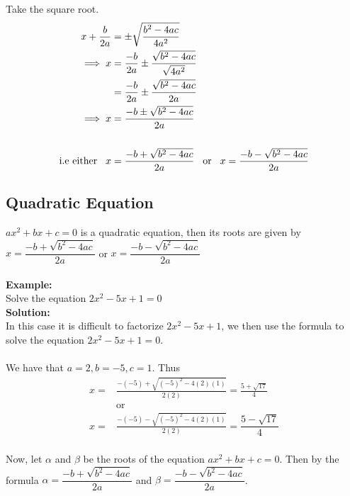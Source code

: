 \documentclass[11pt,a4paper]{article}
\begin{document}
Take the square root.
\begin{align*}
x+\frac{b}{2a} & = \pm \sqrt{\dfrac{b^2-4ac}{4a^2}}\\
\implies x & = \frac{-b}{2a}\pm \frac{\sqrt{b^2-4ac}}{\sqrt{4a^2}}\\
           & = \frac{-b}{2a} \pm \frac{\sqrt{b^2-4ac}}{2a}\\
\implies x & = \frac{-b\pm \sqrt{b^2-4ac}}{2a}\\\\
\text{i.e either}\hspace{0.3cm} x &=\frac{-b+\sqrt{b^2-4ac}}{2a}\hspace{0.3cm}  \text{or} \hspace{0.3cm} x=\frac{-b-\sqrt{b^2-4ac}}{2a}\\
\end{align*}






\subsection{Quadratic Equation}
$ax^2+bx+c=0$ is a quadratic equation, then its roots are given by $x=\dfrac{-b+\sqrt{b^2-4ac}}{2a}$ or $x=\dfrac{-b-\sqrt{b^2-4ac}}{2a}$\\\\

\textbf{Example:}\\
Solve the equation $2x^2-5x+1=0$\\

\textbf{Solution:}\\
In this case it is difficult to factorize $2x^2-5x+1$, we then use the formula to solve the equation $2x^2-5x+1=0$.\\\\
We have that $a=2, b=-5, c=1$. Thus
\begin{align*}
x= &\frac{-(-5)+\sqrt{(-5)^2-4(2)(1)}}{2(2)}=\frac{5+\sqrt{17}}{4}\\
&\text{or}\\
x = & \frac{-(-5)-\sqrt{(-5)^2-4(2)(1)}}{2(2)}=\dfrac{5-\sqrt{17}}{4}\\
\end{align*}


Now, let $\alpha$ and $\beta$ be the roots of the equation $ax^2+bx+c=0$. Then by the formula $\alpha = \dfrac{-b+\sqrt{b^2-4ac}}{2a}$ and $\beta =\dfrac{-b-\sqrt{b^2-4ac}}{2a}$.\\\\
\end{document}
